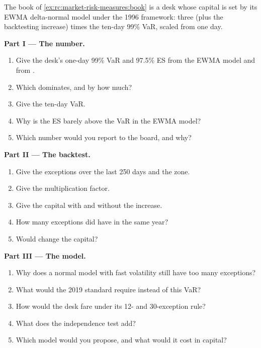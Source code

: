\begin{problem}\label{pb:rc:market-risk-measures:1}
The book of \cref{ex:rc:market-risk-measures:book} is a desk whose capital is set by its EWMA
delta-normal model under the 1996 framework: three (plus the backtesting increase) times the
ten-day 99\% VaR, scaled from one day.

\medskip\noindent\textbf{Part I --- The number.}
\begin{enumerate}
\item Give the desk's one-day 99\% VaR and 97.5\% ES from the EWMA model and from .
\item Which  dominates, and by how much?
\item Give the ten-day VaR.
\item Why is the ES barely above the VaR in the EWMA model?
\item Which number would you report to the board, and why?
\end{enumerate}

\medskip\noindent\textbf{Part II --- The backtest.}
\begin{enumerate}[resume]
\item Give the exceptions over the last 250 days and the zone.
\item Give the multiplication factor.
\item Give the capital with and without the increase.
\item How many exceptions did  have in the same year?
\item Would  change the capital?
\end{enumerate}

\medskip\noindent\textbf{Part III --- The model.}
\begin{enumerate}[resume]
\item Why does a normal model with fast volatility still have too many exceptions?
\item What would the 2019 standard require instead of this VaR?
\item How would the desk fare under its 12- and 30-exception rule?
\item What does the independence test add?
\item Which model would you propose, and what would it cost in capital?
\end{enumerate}


\end{problem}
